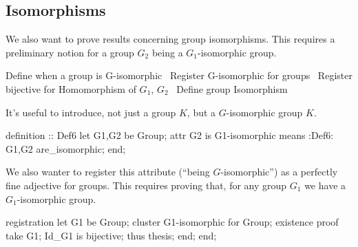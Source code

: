 \subsection{Isomorphisms}%

\M
We also want to prove results concerning group isomorphisms. This
requires a preliminary notion for a group $G_{2}$ being a
$G_{1}$-isomorphic group.

\nwenddocs{}\endmoddef\nwstartdeflinemarkup\nwenddeflinemarkup
\LA{}Define when a group is \code{}G-isomorphic\edoc{}~{\nwtagstyle{}}\RA{}
\LA{}Register \code{}G-isomorphic\edoc{} for groups~{\nwtagstyle{}}\RA{}
\LA{}Register \code{}bijective\edoc{} for \code{}Homomorphism\edoc{} of $G_{1}$, $G_{2}$~{\nwtagstyle{}}\RA{}
\LA{}Define group \code{}Isomorphism\edoc{}~{\nwtagstyle{}}\RA{}

\nwendcode{}\nwdocspar


\M It's useful to introduce, not just a group $K$, but a $G$-isomorphic
group $K$.

\nwenddocs{}\endmoddef\nwstartdeflinemarkup{}\nwenddeflinemarkup
definition :: Def6
  let G1,G2 be Group;
  attr G2 is G1-isomorphic means :Def6:
  G1,G2 are_isomorphic;
end;

\nwendcode{}\nwdocspar

\M We also wanter to register this attribute (``being $G$-isomorphic'')
as a perfectly fine adjective for groups. This requires proving that,
for any group $G_{1}$ we have a $G_{1}$-isomorphic group.

\nwenddocs{}\endmoddef\nwstartdeflinemarkup{}\nwenddeflinemarkup
registration
  let G1 be Group;
  cluster G1-isomorphic for Group;
  existence
  proof
    take G1;
    Id_G1 is bijective;
    thus thesis;
  end;
end;

